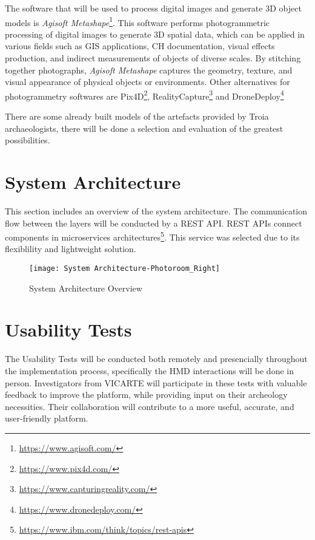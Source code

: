 The software that will be used to process digital images and generate \gls{3D} object models is \textit{Agisoft Metashape}\footnote{\url{https://www.agisoft.com/}}.
This software performs photogrammetric processing of digital images to generate \gls{3D} spatial data, which can be applied in various fields such as \gls{GIS} applications, \gls{CH} documentation, visual effects production, and indirect measurements of objects of diverse scales. 
By stitching together photographs, \textit{Agisoft Metashape} captures the geometry, texture, and visual appearance of physical objects or environments.
Other alternatives for photogrammetry softwares are Pix4D\footnote{\url{https://www.pix4d.com/}}, RealityCapture\footnote{\url{https://www.capturingreality.com/}} and DroneDeploy\footnote{\url{https://www.dronedeploy.com/}}

There are some already built models of the artefacts provided by Troia archaeologists, there will be done a selection and evaluation of the greatest possibilities.


\section{System Architecture}
\label{sec:architecture}

This section includes an overview of the system architecture. The communication flow between the layers will be conducted by a REST \gls{API}.
REST \glspl{API} connect components in microservices architectures\footnote{\url{https://www.ibm.com/think/topics/rest-apis}}.
This service was selected due to its flexiblility and lightweight solution. 

\begin{figure}[h!]
    \centering
    \texttt{[image: System Architecture-Photoroom\_Right]}
    \caption{System Architecture Overview}
    \label{fig:architecture}
  \end{figure}
  \FloatBarrier


\section{Usability Tests}
\label{sec:usability_tests}

The Usability Tests will be conducted both remotely and presencially throughout the implementation process, specifically the \gls{HMD} interactions will be done in person.
Investigators from \gls{VICARTE} will participate in these tests with valuable feedback to improve the platform, while providing input on their archeology necessities. Their collaboration will contribute to a more useful, accurate, and user-friendly platform.

